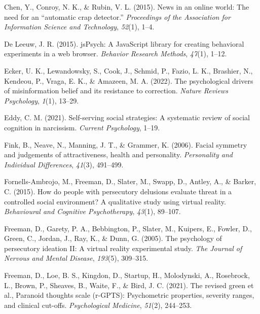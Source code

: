 \documentclass[
  man,mask,floatsintext]{apa6}
\newlength{\cslhangindent}
\newlength{\cslentryspacingunit} %
\newenvironment{CSLReferences}[2] %
 {%
  \setlength{\parindent}{0pt}
  \ifodd #1
  \let\oldpar\par
  \def\par{\hangindent=\cslhangindent\oldpar}
  \fi
  \setlength{\parskip}{#2\cslentryspacingunit}
 }%
 {}
\begin{document}
\begin{CSLReferences}{1}{0}
\leavevmode{}%
Chen, Y., Conroy, N. K., \& Rubin, V. L. (2015). News in an online world: The need for an {``automatic crap detector.''} \emph{Proceedings of the Association for Information Science and Technology}, \emph{52}(1), 1--4.

\leavevmode{}%
De Leeuw, J. R. (2015). jsPsych: A JavaScript library for creating behavioral experiments in a web browser. \emph{Behavior Research Methods}, \emph{47}(1), 1--12.

\leavevmode{}%
Ecker, U. K., Lewandowsky, S., Cook, J., Schmid, P., Fazio, L. K., Brashier, N., Kendeou, P., Vraga, E. K., \& Amazeen, M. A. (2022). The psychological drivers of misinformation belief and its resistance to correction. \emph{Nature Reviews Psychology}, \emph{1}(1), 13--29.

\leavevmode{}%
Eddy, C. M. (2021). Self-serving social strategies: A systematic review of social cognition in narcissism. \emph{Current Psychology}, 1--19.

\leavevmode{}%
Fink, B., Neave, N., Manning, J. T., \& Grammer, K. (2006). Facial symmetry and judgements of attractiveness, health and personality. \emph{Personality and Individual Differences}, \emph{41}(3), 491--499.

\leavevmode{}%
Fornells-Ambrojo, M., Freeman, D., Slater, M., Swapp, D., Antley, A., \& Barker, C. (2015). How do people with persecutory delusions evaluate threat in a controlled social environment? A qualitative study using virtual reality. \emph{Behavioural and Cognitive Psychotherapy}, \emph{43}(1), 89--107.

\leavevmode{}%
Freeman, D., Garety, P. A., Bebbington, P., Slater, M., Kuipers, E., Fowler, D., Green, C., Jordan, J., Ray, K., \& Dunn, G. (2005). The psychology of persecutory ideation II: A virtual reality experimental study. \emph{The Journal of Nervous and Mental Disease}, \emph{193}(5), 309--315.

\leavevmode{}%
Freeman, D., Loe, B. S., Kingdon, D., Startup, H., Molodynski, A., Rosebrock, L., Brown, P., Sheaves, B., Waite, F., \& Bird, J. C. (2021). The revised green et al., Paranoid thoughts scale (r-GPTS): Psychometric properties, severity ranges, and clinical cut-offs. \emph{Psychological Medicine}, \emph{51}(2), 244--253.


\end{CSLReferences}
\end{document}
